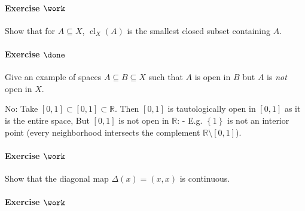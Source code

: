 \hypertarget{exercise-work}{%
\paragraph{\texorpdfstring{Exercise
\(\work\)}{Exercise \textbackslash work}}\label{exercise-work}}

Show that for \(A\subseteq X\), \({ \operatorname{cl}} _X(A)\) is the
smallest closed subset containing \(A\).

\hypertarget{exercise-done}{%
\paragraph{\texorpdfstring{Exercise
\(\done\)}{Exercise \textbackslash done}}\label{exercise-done}}

Give an example of spaces \(A\subseteq B \subseteq X\) such that \(A\)
is open in \(B\) but \(A\) is \emph{not} open in \(X\).

\begin{solution}

\hfill

\begin{concept}

\hfill

\end{concept}

No: Take \([0, 1] \subset [0, 1] \subset {\mathbb{R}}\). Then \([0, 1]\)
is tautologically open in \([0, 1]\) as it is the entire space, But
\([0, 1]\) is not open in \({\mathbb{R}}\): - E.g.
\(\left\{{1}\right\}\) is not an interior point (every neighborhood
intersects the complement \({\mathbb{R}}\setminus[0, 1]\)).

\end{solution}

\hypertarget{exercise-work-1}{%
\paragraph{\texorpdfstring{Exercise
\(\work\)}{Exercise \textbackslash work}}\label{exercise-work-1}}

Show that the diagonal map \(\Delta(x) = (x, x)\) is continuous.

\hypertarget{exercise-work-2}{%
\paragraph{\texorpdfstring{Exercise
\(\work\)}{Exercise \textbackslash work}}\label{exercise-work-2}}

